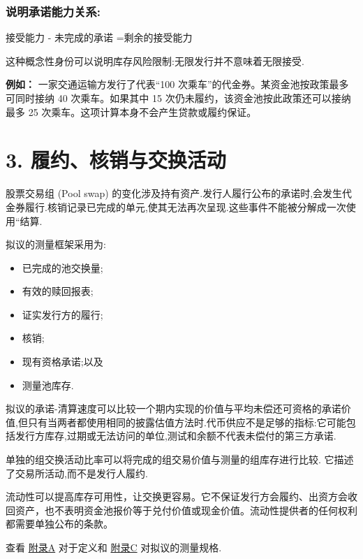 \documentclass[11pt]{article}
\begin{document}
\subsubsection*{说明承诺能力关系:}

接受能力 - 未完成的承诺 =剩余的接受能力

这种概念性身份可以说明库存风险限制:无限发行并不意味着无限接受.

\textbf{例如：} 一家交通运输方发行了代表``100 次乘车''的代金券。某资金池按政策最多可同时接纳 40 次乘车。如果其中 15 次仍未履约，该资金池按此政策还可以接纳最多 25 次乘车。这项计算本身不会产生贷款或履约保证。



\section*{3. 履约、核销与交换活动}

股票交易组 (Pool swap) 的变化涉及持有资产.发行人履行公布的承诺时,会发生代金券履行.核销记录已完成的单元,使其无法再次呈现.这些事件不能被分解成一次使用``结算.

拟议的测量框架采用为:

\begin{itemize}[leftmargin=*]
\item 已完成的池交换量;
\item 有效的赎回报表;
\item 证实发行方的履行;
\item 核销;
\item 现有资格承诺;以及
\item 测量池库存.
\end{itemize}
拟议的承诺-清算速度可以比较一个期内实现的价值与平均未偿还可资格的承诺价值,但只有当两者都使用相同的披露估值方法时.代币供应不是足够的指标:它可能包括发行方库存,过期或无法访问的单位,测试和余额不代表未偿付的第三方承诺.

单独的组交换活动比率可以将完成的组交易价值与测量的组库存进行比较. 它描述了交易所活动,而不是发行人履约.

流动性可以提高库存可用性，让交换更容易。它不保证发行方会履约、出资方会收回资产，也不表明资金池报价等于兑付价值或现金价值。流动性提供者的任何权利都需要单独公布的条款。

查看 \href{https://docs.cosmolocal.credit/zh/white-paper/appendix-a-math-box}{附录A} 对于定义和 \href{https://docs.cosmolocal.credit/zh/white-paper/appendix-c-kpi-definitions}{附录C} 对拟议的测量规格.
\end{document}
